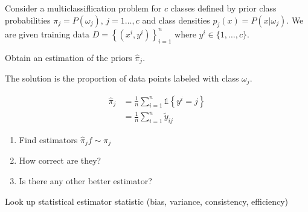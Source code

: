 \begin{exercise}{}{} Consider a multiclassiflication problem for
$c$ classes defined by prior class probabilities
$\pi_j = P(\omega_j),\, j=1\dots, c$ and class densities
$p_j(x) = P(x|\omega_j)$. We are given training data
$D = \left\{ (x^i, y^i) \right\}_{i=1}^n$ where $y^i \in \{1, \dots, c\}$.

Obtain an estimation of the priors $\hat\pi_j$.


The solution is the proportion of data points labeled with class $\omega_j$.

\tcblower

\begin{align*}
  \hat\pi_j &= \frac{1}{n} \sum_{i=1}^n \mathds{1}\left\{ y^i = j \right\} \\
  &= \frac{1}{n} \sum_{i=1}^n \tilde{y}_{ij}
\end{align*}

\end{exercise}

\begin{exercise}{}{}
\begin{enumerate}
  \item Find estimators $\hat\pi_j f\sim\pi_j$
  \item How correct are they?
  \item Is there any other better estimator?
\end{enumerate}

\begin{hint}
  Look up statistical estimator statistic (bias, variance, consistency, efficiency)
\end{hint}
\end{exercise}
